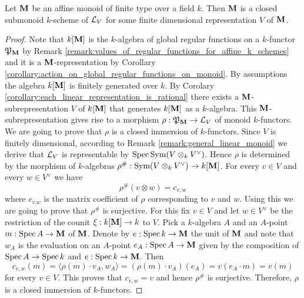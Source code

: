 \begin{proposition}\label{proposition:in_affine_monoid_of_finite_type_over_field_is_a_submonoid_of_general_linear_monoid}
Let $\mathbf{M}$ be an affine monoid of finite type over a field $k$. Then $\mathbf{M}$ is a closed submonoid $k$-scheme of ${\mathcal L}_V$ for some finite dimensional representation $V$ of $\mathbf{M}$.
\end{proposition}
\begin{proof}
Note that $k[\mathbf{M}]$ is the $k$-algebra of global regular functions on a $k$-functor ${\mathfrak P}_{\mathbf{M}}$ by Remark \ref{remark:values_of_regular_functions_for_affine_k_schemes} and it is a $\mathbf{M}$-representation by Corollary \ref{corollary:action_on_global_regular_functions_on_monoid}. By assumptions the algebra $k[\mathbf{M}]$ is finitely generated over $k$. By Corolary \ref{corollary:each_linear_representation_is_rational} there exists a $\mathbf{M}$-subrepresentation $V$ of $k[\mathbf{M}]$ that generates $k[\mathbf{M}]$ as a $k$-algebra. This $\mathbf{M}$-subrepresentation gives rise to a morphism $\rho:{\mathfrak P}_{\mathbf{M}}\rightarrow {\mathcal L}_V$ of monoid $k$-functors. We are going to prove that $\rho$ is a closed immersion of $k$-functors. Since $V$ is finitely dimensional, according to Remark \ref{remark:general_linear_monoid} we derive that ${\mathcal L}_V$ is representable by $\mathrm{Spec}\, \textrm{Sym}(V\otimes_kV^{\vee})$. Hence $\rho$ is determined by the morphism of $k$-algebras $\rho^{\#}:\textrm{Sym}(V\otimes_kV^{\vee})\rightarrow k[\mathbf{M}]$. For every $v\in V$ and every $w\in V^\vee$ we have
$$\rho^{\#}(v\otimes w) = c_{v,w}$$
where $c_{v.w}$ is the matrix coefficient of $\rho$ corresponding to $v$ and $w$. Using this we are going to prove that $\rho^{\#}$ is surjective. For this fix $v\in V$ and let $w\in V^{\vee}$ be the restriction of the counit $\xi:k[\mathbf{M}]\rightarrow k$ to $V$. Pick a $k$-algebra $A$ and an $A$-point $m:\mathrm{Spec}\, A\rightarrow \mathbf{M}$ of $\mathbf{M}$. Denote by $e:\mathrm{Spec}\, k\rightarrow \mathbf{M}$ the unit of $\mathbf{M}$ and note that $w_A$ is the evaluation on an $A$-point $e_A:\mathrm{Spec}\, A\rightarrow \mathbf{M}$ given by the composition of $\mathrm{Spec}\, A\rightarrow \mathrm{Spec}\, k$ and $e:\mathrm{Spec}\, k\rightarrow \mathbf{M}$. Then
$$c_{v,w}(m) = \langle \rho(m)\cdot v_A,w_A \rangle = \left(\rho(m)\cdot v_A\right)(e_A) = v(e_A\cdot m) =  v(m)$$
for every $v\in V$. This proves that $c_{v,w} = v$ and hence $\rho^{\#}$ is surjective. Therefore, $\rho$ is a closed immersion of $k$-functors.
\end{proof}













\small






